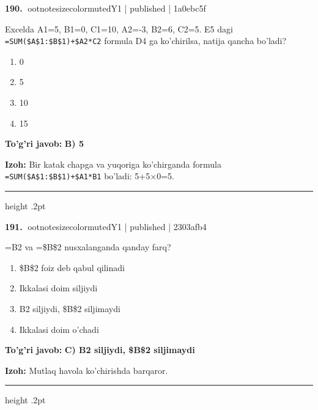 \documentclass[10pt,a4paper]{article}
\begin{document}
\textbf{\color{ink}190.} {ootnotesizecolor{muted}Y1 | published | 1a0ebc5f}
\par
Excelda A1=5, B1=0, C1=10, A2=-3, B2=6, C2=5. E5 dagi \texttt{=SUM(\$A\$1:\$B\$1)+\$A2*C2} formula D4 ga ko'chirilsa, natija qancha bo'ladi?
\begin{enumerate}[label=\Alph*),leftmargin=9mm]
\item 0
\item 5
\item 10
\item 15
\end{enumerate}
\begin{tcolorbox}[enhanced,breakable,colback=teal!4,colframe=teal!55!black,boxrule=0.45pt,arc=1.2mm,left=2.8mm,right=2.8mm,top=2mm,bottom=2mm]
\textbf{\color{teal}To'g'ri javob:} \textbf{B) 5}
\par\smallskip
\textbf{Izoh:} Bir katak chapga va yuqoriga ko'chirganda formula \texttt{=SUM(\$A\$1:\$B\$1)+\$A1*B1} bo'ladi: 5+5\ensuremath{\times}0=5.
\end{tcolorbox}
\vspace{2mm}\hrule height .2pt\vspace{2mm}

\textbf{\color{ink}191.} {ootnotesizecolor{muted}Y1 | published | 2303afb4}
\par
=B2 va =\$B\$2 nusxalanganda qanday farq?
\begin{enumerate}[label=\Alph*),leftmargin=9mm]
\item \$B\$2 foiz deb qabul qilinadi
\item Ikkalasi doim siljiydi
\item B2 siljiydi, \$B\$2 siljimaydi
\item Ikkalasi doim o'chadi
\end{enumerate}
\begin{tcolorbox}[enhanced,breakable,colback=teal!4,colframe=teal!55!black,boxrule=0.45pt,arc=1.2mm,left=2.8mm,right=2.8mm,top=2mm,bottom=2mm]
\textbf{\color{teal}To'g'ri javob:} \textbf{C) B2 siljiydi, \$B\$2 siljimaydi}
\par\smallskip
\textbf{Izoh:} Mutlaq havola ko'chirishda barqaror.
\end{tcolorbox}
\vspace{2mm}\hrule height .2pt\vspace{2mm}
\end{document}
